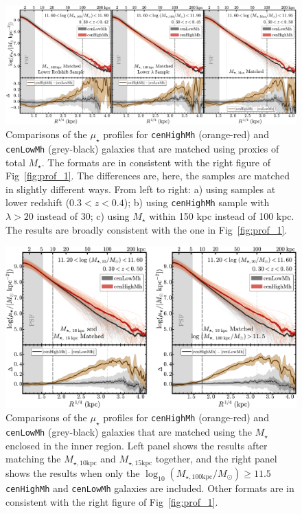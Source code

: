 \documentclass[a4paper,fleqn,usenatbib]{mnras}
\def\rbcg{\texttt{cenHighMh}}
\def\nbcg{\texttt{cenLowMh}}
\def\mstar{{$M_{\star}$}}
\def\minn{{$M_{\star,10\mathrm{kpc}}$}}
\def\meff{{$M_{\star,15\mathrm{kpc}}$}}
\def\logmtot{{$\log_{10} (M_{\star,100\mathrm{kpc}}/M_{\odot})$}}
\def\mden{{$\mu_{\star}$}}
\begin{document}
  \begin{figure}
      \centering 
      \includegraphics[width=\textwidth]{fig/redbcg_prof_3}
      \caption{
        Comparisons of the \mden{} profiles for \rbcg{} (orange-red) and \nbcg{} 
      	(grey-black) galaxies that are matched using proxies of total \mstar{}. 
        The formats are in consistent with the right figure of Fig~\ref{fig:prof_1}.
        The differences are, here, the samples are matched in slightly different ways. 
        From left to right: a) using samples at lower redshift ($0.3 < z < 0.4$); 
        b) using \rbcg{} sample with $\lambda > 20$ instead of 30; 
        c) using \mstar{} within 150 kpc instead of 100 kpc.
        The results are broadly consistent with the one in Fig~\ref{fig:prof_1}.
        }
      \label{fig:prof_3} 
  \end{figure}

  \begin{figure}
      \centering 
      \includegraphics[width=15.5cm]{fig/redbcg_prof_4}
      \caption{
          Comparisons of the \mden{} profiles for \rbcg{} (orange-red) and \nbcg{} 
          (grey-black) galaxies that are matched using the \mstar{} enclosed in the 
          inner region. 
          Left panel shows the results after matching the \minn{} and \meff{} together, 
          and the right panel shows the results when only the \logmtot{}$\ge 11.5$
          \rbcg{} and \nbcg{} galaxies are included.
          Other formats are in consistent with the right figure of Fig~\ref{fig:prof_1}.
          }
      \label{fig:prof_4} 
  \end{figure}
\end{document}
